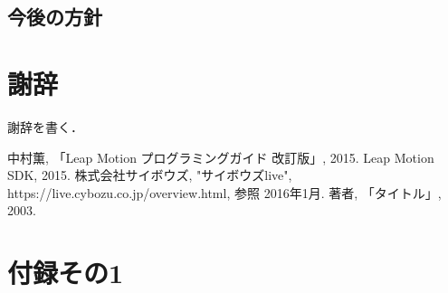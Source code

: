 \documentclass{funthesis}
\begin{document}



\section{今後の方針}



\chapter*{謝辞}

謝辞を書く．


\begin{thebibliography}{9}
  中村薫, 「Leap Motion プログラミングガイド 改訂版」, 2015.
   Leap Motion SDK, 2015.
  株式会社サイボウズ, "サイボウズlive", https://live.cybozu.co.jp/overview.html, 参照 2016年1月.
  著者, 「タイトル」, 2003.
\end{thebibliography}





\appendix

\chapter*{付録その1} %
\end{document}
